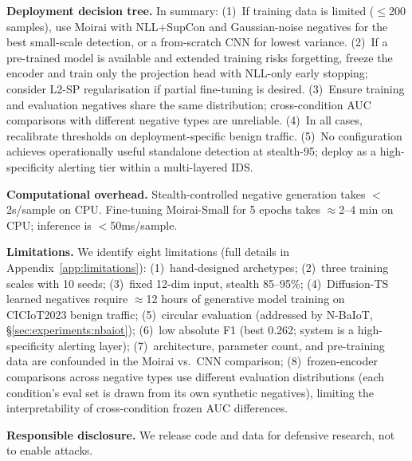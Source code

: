 \textbf{Deployment decision tree.}
In summary:
(1)~If training data is limited ($\leq$200 samples), use Moirai with
NLL$+$SupCon and Gaussian-noise negatives for the best small-scale
detection, or a from-scratch CNN for lowest variance.
(2)~If a pre-trained model is available and extended training risks
forgetting, freeze the encoder and train only the projection head
with NLL-only early stopping; consider L2-SP regularisation if partial
fine-tuning is desired.
(3)~Ensure training and evaluation negatives share the same distribution;
cross-condition AUC comparisons with different negative types are unreliable.
(4)~In all cases, recalibrate thresholds on deployment-specific benign traffic.
(5)~No configuration achieves operationally useful standalone detection
at stealth-95; deploy as a high-specificity alerting tier within a
multi-layered IDS.

\textbf{Computational overhead.}
Stealth-controlled negative generation takes $<$2s/sample on CPU.
Fine-tuning Moirai-Small for 5 epochs takes $\approx$2--4 min on CPU;
inference is $<$50ms/sample.

\textbf{Limitations.}
We identify eight limitations (full details in Appendix~\ref{app:limitations}):
(1)~hand-designed archetypes;
(2)~three training scales with 10 seeds;
(3)~fixed 12-dim input, stealth 85--95\%;
(4)~Diffusion-TS learned negatives require $\approx$12 hours of
generative model training on CICIoT2023 benign traffic;
(5)~circular evaluation (addressed by N-BaIoT, \S\ref{sec:experiments:nbaiot});
(6)~low absolute F1 (best 0.262; system is a high-specificity alerting layer);
(7)~architecture, parameter count, and pre-training data are confounded
in the Moirai vs.\ CNN comparison;
(8)~frozen-encoder comparisons across negative types use different evaluation
distributions (each condition's eval set is drawn from its own synthetic
negatives), limiting the interpretability of cross-condition frozen AUC
differences.

\textbf{Responsible disclosure.}
We release code and data for defensive research, not to enable attacks.
